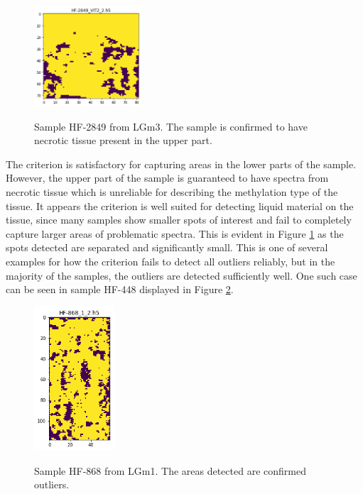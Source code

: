 \begin{figure}[H]

    \centering
{\includegraphics[width=4cm]{images/AdriansCriterion/LGm-3/HF-2849_VIT2_2.h5_5.png} }
\caption{Sample HF-2849 from LGm3. The sample is confirmed to have necrotic tissue present in the upper part.\label{fig:HF2849_1}}%

\end{figure}

The criterion is satisfactory for capturing areas in the lower parts of the sample. However, the upper part of the sample is guaranteed to have spectra from necrotic tissue which is unreliable for describing the methylation type of the tissue. It appears the criterion is well suited for detecting liquid material on the tissue, since many samples show smaller spots of interest and fail to completely capture larger areas of problematic spectra. This is evident in Figure \ref{fig:HF2849_1} as the spots detected are separated and significantly small. This is one of several examples for how the criterion fails to detect all outliers reliably, but in the majority of the samples, the outliers are detected sufficiently well. One such case can be seen in sample HF-448 displayed in Figure \ref{fig:ADHF868}.

\begin{figure}[H]

    \centering
{\includegraphics[width=3cm]{images/AdriansCriterion/LGm-1/HF-868_1_2.h5_0.png} }
\caption{Sample HF-868 from LGm1. The areas detected are confirmed outliers.\label{fig:ADHF868}}%

\end{figure}

